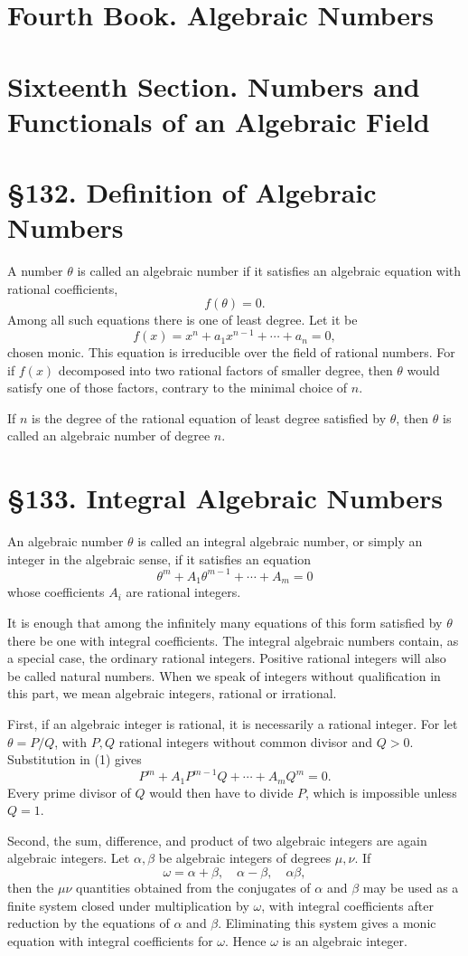 \documentclass[12pt,a4paper]{article}
\newcommand{\webersection}[2]{\clearpage\section*{\S #1. #2}}
\newcommand{\booktitle}[1]{\clearpage\section*{#1}}
\begin{document}
\booktitle{Fourth Book. Algebraic Numbers}
\booktitle{Sixteenth Section. Numbers and Functionals of an Algebraic Field}

\webersection{132}{Definition of Algebraic Numbers}

A number \(\theta\) is called an algebraic number if it satisfies an algebraic equation with rational coefficients,
\begin{equation}
 f(\theta)=0. \tag{1}
\end{equation}
Among all such equations there is one of least degree.  Let it be
\begin{equation}
 f(x)=x^n+a_1x^{n-1}+\cdots+a_n=0, \tag{2}
\end{equation}
chosen monic.  This equation is irreducible over the field of rational numbers.  For if \(f(x)\) decomposed into two rational factors of smaller degree, then \(\theta\) would satisfy one of those factors, contrary to the minimal choice of \(n\).

If \(n\) is the degree of the rational equation of least degree satisfied by \(\theta\), then \(\theta\) is called an algebraic number of degree \(n\).

\webersection{133}{Integral Algebraic Numbers}

An algebraic number \(\theta\) is called an integral algebraic number, or simply an integer in the algebraic sense, if it satisfies an equation
\begin{equation}
 \theta^m+A_1\theta^{m-1}+\cdots+A_m=0 \tag{1}
\end{equation}
whose coefficients \(A_i\) are rational integers.

It is enough that among the infinitely many equations of this form satisfied by \(\theta\) there be one with integral coefficients.  The integral algebraic numbers contain, as a special case, the ordinary rational integers.  Positive rational integers will also be called natural numbers.  When we speak of integers without qualification in this part, we mean algebraic integers, rational or irrational.

First, if an algebraic integer is rational, it is necessarily a rational integer.  For let \(\theta=P/Q\), with \(P,Q\) rational integers without common divisor and \(Q>0\).  Substitution in (1) gives
\[
 P^m+A_1P^{m-1}Q+\cdots+A_mQ^m=0.
\]
Every prime divisor of \(Q\) would then have to divide \(P\), which is impossible unless \(Q=1\).

Second, the sum, difference, and product of two algebraic integers are again algebraic integers.  Let \(\alpha,\beta\) be algebraic integers of degrees \(\mu,\nu\).  If
\[
 \omega=\alpha+\beta,
\quad \alpha-\beta,
\quad \alpha\beta,
\]
then the \(\mu\nu\) quantities obtained from the conjugates of \(\alpha\) and \(\beta\) may be used as a finite system closed under multiplication by \(\omega\), with integral coefficients after reduction by the equations of \(\alpha\) and \(\beta\).  Eliminating this system gives a monic equation with integral coefficients for \(\omega\).  Hence \(\omega\) is an algebraic integer.
\end{document}
